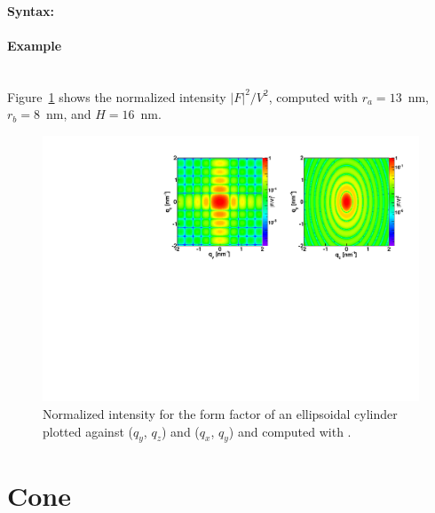 \paragraph{Syntax:} 

\newpage


\paragraph{Example}\mbox{}\\
Figure~\ref{fig:FFellipscylinderEx} shows the normalized intensity
$|F|^2/V^2$, computed with $r_a=13$~nm, $r_b=8$~nm, and $H=16$~nm.
\begin{figure}[h]
\begin{center}
\includegraphics[width=\textwidth]{Figures/figffellipscylinder}
\end{center}
\caption{Normalized intensity for the form factor of an ellipsoidal
  cylinder plotted against ($q_y$, $q_z$) and ($q_x$,
  $q_y$) and computed with .}
\label{fig:FFellipscylinderEx}
\end{figure}


\newpage%
\section{Cone}  

